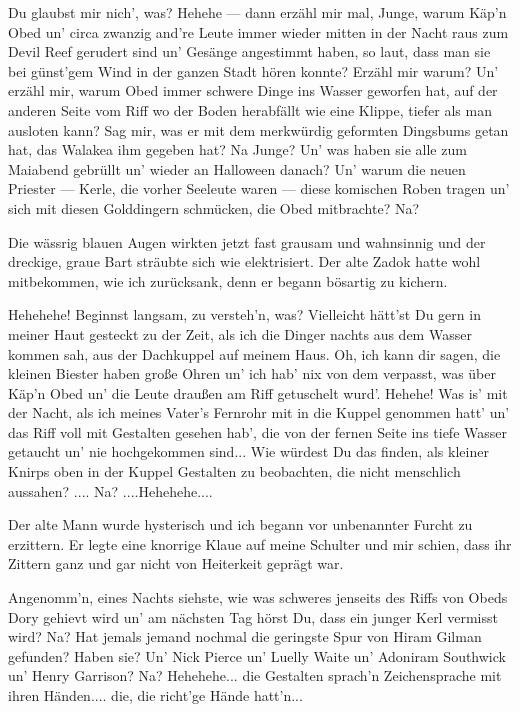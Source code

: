 \glqq Du glaubst mir nich', was? Hehehe --- dann erzähl mir mal, Junge, warum Käp'n Obed un' circa zwanzig and're Leute immer wieder mitten in der Nacht raus zum Devil Reef gerudert sind un' Gesänge angestimmt haben, so laut, dass man sie bei günst'gem Wind in der ganzen Stadt hören konnte? Erzähl mir warum? Un' erzähl mir, warum Obed immer schwere Dinge ins Wasser geworfen hat,  auf der anderen Seite vom Riff wo der Boden herabfällt wie eine Klippe, tiefer als man ausloten kann? Sag mir, was er mit dem merkwürdig geformten Dingsbums getan hat, das Walakea ihm gegeben hat? Na Junge? Un' was haben sie alle zum Maiabend gebrüllt un' wieder an Halloween danach? Un' warum die neuen Priester --- Kerle, die vorher Seeleute waren --- diese komischen Roben tragen un' sich mit diesen Golddingern schmücken, die Obed mitbrachte? Na?\grqq

Die wässrig blauen Augen wirkten jetzt fast grausam und wahnsinnig und der dreckige, graue Bart sträubte sich wie elektrisiert. Der alte Zadok hatte wohl mitbekommen, wie ich zurücksank, denn er begann bösartig zu kichern.

\glqq Hehehehe! Beginnst langsam, zu versteh'n, was? Vielleicht hätt'st Du gern in meiner Haut gesteckt zu der Zeit, als ich die Dinger nachts aus dem Wasser kommen sah, aus der Dachkuppel auf meinem Haus. Oh, ich kann dir sagen, die kleinen Biester haben große Ohren un' ich hab' nix von dem verpasst, was über Käp'n Obed un' die Leute draußen am Riff getuschelt wurd'. Hehehe! Was is' mit der Nacht, als ich meines Vater's Fernrohr mit in die Kuppel genommen hatt' un' das Riff voll mit Gestalten gesehen hab', die von der fernen Seite ins tiefe Wasser getaucht un' nie hochgekommen sind... Wie würdest Du das finden, als kleiner Knirps oben in der Kuppel Gestalten zu beobachten, die nicht menschlich aussahen? .... Na? ....Hehehehe....\grqq

Der alte Mann wurde hysterisch und ich begann vor unbenannter Furcht zu erzittern. Er legte eine knorrige Klaue auf meine Schulter und mir schien, dass ihr Zittern ganz und gar nicht von Heiterkeit geprägt war.

\glqq Angenomm'n, eines Nachts siehste, wie was schweres jenseits des Riffs von Obeds Dory gehievt wird un' am nächsten Tag hörst Du, dass ein junger Kerl vermisst wird? Na? Hat jemals jemand nochmal die geringste Spur von Hiram Gilman gefunden? Haben sie? Un' Nick Pierce un' Luelly Waite un' Adoniram Southwick un' Henry Garrison? Na? Hehehehe... die Gestalten sprach'n Zeichensprache mit ihren Händen.... die, die richt'ge Hände hatt'n...

